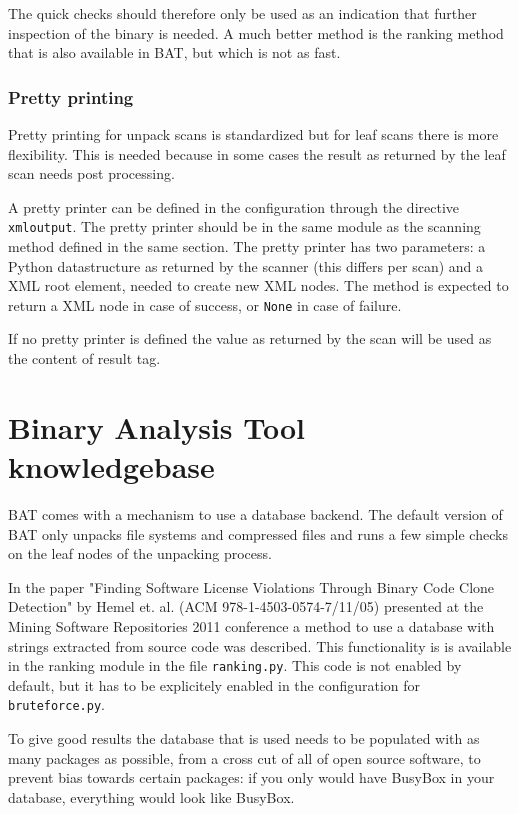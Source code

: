 \documentclass[10pt]{article}
\begin{document}
The quick checks should therefore only be used as an indication that further
inspection of the binary is needed. A much better method is the ranking method
that is also available in BAT, but which is not as fast.

\subsubsection{Pretty printing}

Pretty printing for unpack scans is standardized but for leaf scans there is
more flexibility. This is needed because in some cases the result as returned
by the leaf scan needs post processing.

A pretty printer can be defined in the configuration through the directive
\texttt{xmloutput}. The pretty printer should be in the same module as the
scanning method defined in the same section. The pretty printer has two
parameters: a Python datastructure as returned by the scanner (this differs
per scan) and a XML root element, needed to create new XML nodes. The method is
expected to return a XML node in case of success, or \texttt{None} in case of
failure.

If no pretty printer is defined the value as returned by the scan will be used
as the content of result tag.

\section{Binary Analysis Tool knowledgebase}

BAT comes with a mechanism to use a database backend. The default version of
BAT only unpacks file systems and compressed files and runs a few simple checks
on the leaf nodes of the unpacking process.

In the paper "Finding Software License Violations Through Binary Code Clone
Detection" by Hemel et. al. (ACM 978-1-4503-0574-7/11/05) presented at
the Mining Software Repositories 2011 conference a method to use a database
with strings extracted from source code was described. This functionality is
is available in the ranking module in the file \texttt{ranking.py}. This code
is not enabled by default, but it has to be explicitely enabled in the
configuration for \texttt{bruteforce.py}.

To give good results the database that is used needs to be populated with as
many packages as possible, from a cross cut of all of open source software, to
prevent bias towards certain packages: if you only would have BusyBox in your
database, everything would look like BusyBox.
\end{document}
